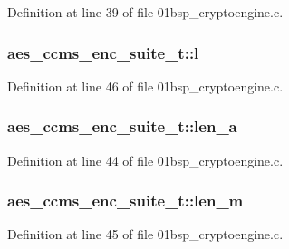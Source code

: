Definition at line 39 of file 01bsp\+\_\+cryptoengine.\+c.

\subsubsection[{\texorpdfstring{l}{l}}]{ aes\+\_\+ccms\+\_\+enc\+\_\+suite\+\_\+t\+::l}\hypertarget{structaes__ccms__enc__suite__t_a29462cc3303d97004b99c42645c4e58b}{}\label{structaes__ccms__enc__suite__t_a29462cc3303d97004b99c42645c4e58b}


Definition at line 46 of file 01bsp\+\_\+cryptoengine.\+c.

\subsubsection[{\texorpdfstring{len\+\_\+a}{len_a}}]{ aes\+\_\+ccms\+\_\+enc\+\_\+suite\+\_\+t\+::len\+\_\+a}\hypertarget{structaes__ccms__enc__suite__t_a17dd6afc7f2c39214654762ad1ab9f6a}{}\label{structaes__ccms__enc__suite__t_a17dd6afc7f2c39214654762ad1ab9f6a}


Definition at line 44 of file 01bsp\+\_\+cryptoengine.\+c.

\subsubsection[{\texorpdfstring{len\+\_\+m}{len_m}}]{ aes\+\_\+ccms\+\_\+enc\+\_\+suite\+\_\+t\+::len\+\_\+m}\hypertarget{structaes__ccms__enc__suite__t_acd7f0eaf4ae125ad0e76cc7b0142beed}{}\label{structaes__ccms__enc__suite__t_acd7f0eaf4ae125ad0e76cc7b0142beed}


Definition at line 45 of file 01bsp\+\_\+cryptoengine.\+c.

